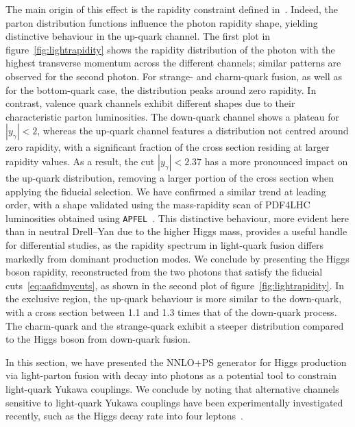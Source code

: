 \documentclass[11pt,a4paper]{article}
\begin{document}
The main origin of this effect is the rapidity constraint defined in~. Indeed, the parton distribution functions influence the photon rapidity shape, yielding distinctive behaviour in the up-quark channel. The first plot in figure~\ref{fig:lightrapidity} shows the rapidity distribution of the photon with the highest transverse momentum across the different channels; similar patterns are observed for the second photon. For strange- and charm-quark fusion, as well as for the bottom-quark case, the distribution peaks around zero rapidity. In contrast, valence quark channels exhibit different shapes due to their characteristic parton luminosities. The down-quark channel shows a plateau for $|y_\gamma| < 2$, whereas the up-quark channel features a distribution not centred around zero rapidity, with a significant fraction of the cross section residing at larger rapidity values. As a result, the cut $|y_\gamma| < 2.37$ has a more pronounced impact on the up-quark distribution, removing a larger portion of the cross section when applying the fiducial selection. We have confirmed a similar trend at leading order, with a shape validated using the mass-rapidity scan of PDF4LHC luminosities obtained using \texttt{APFEL}~\cite{Bertone:2013vaa}. This distinctive behaviour, more evident here than in neutral Drell–Yan due to the higher Higgs mass, provides a useful handle for differential studies, as the rapidity spectrum in light-quark fusion differs markedly from dominant production modes. We conclude by presenting the Higgs boson rapidity, reconstructed from the two photons that satisfy the fiducial cuts~\eqref{eq:aafidmycuts}, as shown in the second plot of figure~\ref{fig:lightrapidity}. In the exclusive region, the up-quark behaviour is more similar to the down-quark, with a cross section between 1.1 and 1.3 times that of the down-quark process. The charm-quark and the strange-quark exhibit a steeper distribution compared to the Higgs boson from down-quark fusion.

In this section, we have presented the NNLO+PS generator for Higgs production via light-parton fusion with decay into photons as a potential tool to constrain light-quark Yukawa couplings. We conclude by noting that alternative channels sensitive to light-quark Yukawa couplings have been experimentally investigated recently, such as the Higgs decay rate into four leptons~\cite{CMS:2025xkn}.
\end{document}
